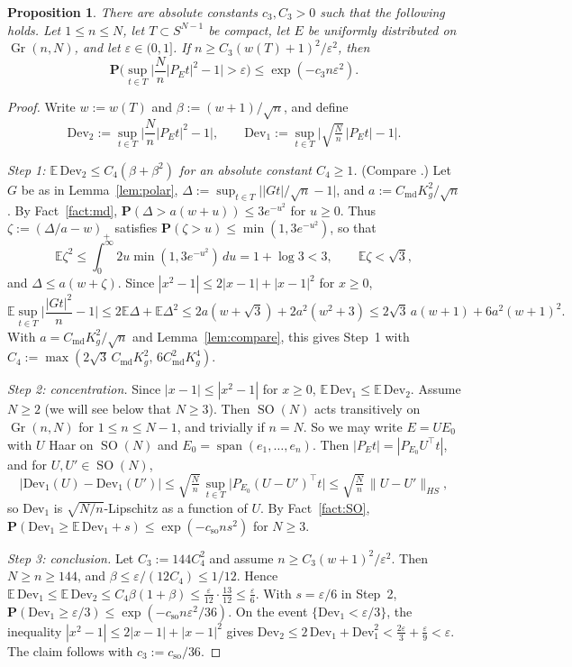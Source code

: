 \documentclass[11pt]{article}
\newtheorem{proposition}[theorem]{Proposition}
\theoremstyle{definition}
\numberwithin{equation}{section}
\newcommand{\E}{\mathbb{E}}
\newcommand{\Prob}{\mathbf{P}}
\newcommand{\eps}{\varepsilon}
\DeclareMathOperator{\Gr}{Gr}
\DeclareMathOperator{\SO}{SO}
\DeclareMathOperator{\spn}{span}
\newcommand{\Cmd}{C_{\mathrm{md}}}
\newcommand{\cso}{c_{\mathrm{so}}}
\begin{document}
\begin{proposition}\label{prop:haar}
There are absolute constants $c_3,C_3>0$ such that the following holds. Let $1\le n\le N$, let $T\subset S^{N-1}$ be compact, let $E$ be uniformly distributed on $\Gr(n,N)$, and let $\eps\in(0,1]$. If $n\ge C_3(w(T)+1)^2/\eps^2$, then
\[
\Prob\Big(\sup_{t\in T}\Big|\frac Nn|P_Et|^2-1\Big|>\eps\Big)\le\exp(-c_3n\eps^2).
\]
\end{proposition}

\begin{proof}
Write $w:=w(T)$ and $\beta:=(w+1)/\sqrt n$, and define
\[
\mathrm{Dev}_2:=\sup_{t\in T}\Big|\frac Nn|P_Et|^2-1\Big|,\qquad\mathrm{Dev}_1:=\sup_{t\in T}\Big|\sqrt{\tfrac Nn}\,|P_Et|-1\Big| .
\]

\emph{Step 1: $\E\,\mathrm{Dev}_2\le C_4(\beta+\beta^2)$ for an absolute constant $C_4\ge1$.} (Compare \cite[Exercise~9.1.11]{Vershynin}.) Let $G$ be as in Lemma~\ref{lem:polar}, $\Delta:=\sup_{t\in T}\big||Gt|/\sqrt n-1\big|$, and $a:=\Cmd K_g^2/\sqrt n$. By Fact~\ref{fact:md}, $\Prob(\Delta>a(w+u))\le3e^{-u^2}$ for $u\ge0$. Thus $\zeta:=(\Delta/a-w)_+$ satisfies $\Prob(\zeta>u)\le\min(1,3e^{-u^2})$, so that
\[
\E\zeta^2\le\int_0^\infty2u\min(1,3e^{-u^2})\,du=1+\log3<3,\qquad\E\zeta<\sqrt3,
\]
and $\Delta\le a(w+\zeta)$. Since $|x^2-1|\le2|x-1|+|x-1|^2$ for $x\ge0$,
\[
\E\sup_{t\in T}\Big|\frac{|Gt|^2}{n}-1\Big|\le2\E\Delta+\E\Delta^2\le2a(w+\sqrt3)+2a^2(w^2+3)\le2\sqrt3\,a(w+1)+6a^2(w+1)^2 .
\]
With $a=\Cmd K_g^2/\sqrt n$ and Lemma~\ref{lem:compare}, this gives Step~1 with $C_4:=\max(2\sqrt3\,\Cmd K_g^2,\,6\Cmd^2K_g^4)$.

\emph{Step 2: concentration.} Since $|x-1|\le|x^2-1|$ for $x\ge0$, $\E\,\mathrm{Dev}_1\le\E\,\mathrm{Dev}_2$. Assume $N\ge2$ (we will see below that $N\ge3$). Then $\SO(N)$ acts transitively on $\Gr(n,N)$ for $1\le n\le N-1$, and trivially if $n=N$. So we may write $E=UE_0$ with $U$ Haar on $\SO(N)$ and $E_0=\spn(e_1,\dots,e_n)$. Then $|P_Et|=|P_{E_0}U^\top t|$, and for $U,U'\in\SO(N)$,
\[
|\mathrm{Dev}_1(U)-\mathrm{Dev}_1(U')|\le\sqrt{\tfrac Nn}\,\sup_{t\in T}\big|P_{E_0}(U-U')^\top t\big|\le\sqrt{\tfrac Nn}\,\|U-U'\|_{HS},
\]
so $\mathrm{Dev}_1$ is $\sqrt{N/n}$-Lipschitz as a function of $U$. By Fact~\ref{fact:SO}, $\Prob(\mathrm{Dev}_1\ge\E\,\mathrm{Dev}_1+s)\le\exp(-\cso ns^2)$ for $N\ge3$.

\emph{Step 3: conclusion.} Let $C_3:=144C_4^2$ and assume $n\ge C_3(w+1)^2/\eps^2$. Then $N\ge n\ge144$, and $\beta\le\eps/(12C_4)\le1/12$. Hence $\E\,\mathrm{Dev}_1\le\E\,\mathrm{Dev}_2\le C_4\beta(1+\beta)\le\frac{\eps}{12}\cdot\frac{13}{12}\le\frac\eps6$. With $s=\eps/6$ in Step~2, $\Prob(\mathrm{Dev}_1\ge\eps/3)\le\exp(-\cso n\eps^2/36)$. On the event $\{\mathrm{Dev}_1<\eps/3\}$, the inequality $|x^2-1|\le2|x-1|+|x-1|^2$ gives $\mathrm{Dev}_2\le2\,\mathrm{Dev}_1+\mathrm{Dev}_1^2<\frac{2\eps}3+\frac\eps9<\eps$. The claim follows with $c_3:=\cso/36$.
\end{proof}
\end{document}
